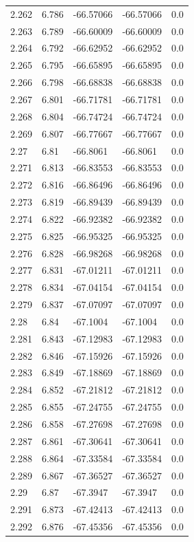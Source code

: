 \begin{tabular}{lllll}
2.262 & 6.786 & -66.57066 & -66.57066 & 0.0 \\
2.263 & 6.789 & -66.60009 & -66.60009 & 0.0 \\
2.264 & 6.792 & -66.62952 & -66.62952 & 0.0 \\
2.265 & 6.795 & -66.65895 & -66.65895 & 0.0 \\
2.266 & 6.798 & -66.68838 & -66.68838 & 0.0 \\
2.267 & 6.801 & -66.71781 & -66.71781 & 0.0 \\
2.268 & 6.804 & -66.74724 & -66.74724 & 0.0 \\
2.269 & 6.807 & -66.77667 & -66.77667 & 0.0 \\
2.27 & 6.81 & -66.8061 & -66.8061 & 0.0 \\
2.271 & 6.813 & -66.83553 & -66.83553 & 0.0 \\
2.272 & 6.816 & -66.86496 & -66.86496 & 0.0 \\
2.273 & 6.819 & -66.89439 & -66.89439 & 0.0 \\
2.274 & 6.822 & -66.92382 & -66.92382 & 0.0 \\
2.275 & 6.825 & -66.95325 & -66.95325 & 0.0 \\
2.276 & 6.828 & -66.98268 & -66.98268 & 0.0 \\
2.277 & 6.831 & -67.01211 & -67.01211 & 0.0 \\
2.278 & 6.834 & -67.04154 & -67.04154 & 0.0 \\
2.279 & 6.837 & -67.07097 & -67.07097 & 0.0 \\
2.28 & 6.84 & -67.1004 & -67.1004 & 0.0 \\
2.281 & 6.843 & -67.12983 & -67.12983 & 0.0 \\
2.282 & 6.846 & -67.15926 & -67.15926 & 0.0 \\
2.283 & 6.849 & -67.18869 & -67.18869 & 0.0 \\
2.284 & 6.852 & -67.21812 & -67.21812 & 0.0 \\
2.285 & 6.855 & -67.24755 & -67.24755 & 0.0 \\
2.286 & 6.858 & -67.27698 & -67.27698 & 0.0 \\
2.287 & 6.861 & -67.30641 & -67.30641 & 0.0 \\
2.288 & 6.864 & -67.33584 & -67.33584 & 0.0 \\
2.289 & 6.867 & -67.36527 & -67.36527 & 0.0 \\
2.29 & 6.87 & -67.3947 & -67.3947 & 0.0 \\
2.291 & 6.873 & -67.42413 & -67.42413 & 0.0 \\
2.292 & 6.876 & -67.45356 & -67.45356 & 0.0 \\

\end{tabular}
